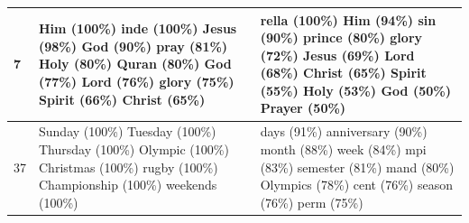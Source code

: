 \documentclass{article}
\begin{document}
\begin{table}[htbp]
\begin{tabular}{p{1.4cm} p{6cm} p{6cm}}
\midrule
7 & \colorbox{lightOlmoeLightBlue}{ Him} (100\%) \colorbox{lightOlmoeLightBlue}{inde} (100\%) \colorbox{lightOlmoeLightBlue}{ Jesus} (98\%) \colorbox{lightOlmoeLightBlue}{God} (90\%) \colorbox{lightOlmoeLightBlue}{ pray} (81\%) \colorbox{lightOlmoeLightBlue}{ Holy} (80\%) \colorbox{lightOlmoeLightBlue}{ Quran} (80\%) \colorbox{lightOlmoeLightBlue}{ God} (77\%) \colorbox{lightOlmoeLightBlue}{ Lord} (76\%) \colorbox{lightOlmoeLightBlue}{ glory} (75\%) \colorbox{lightOlmoeLightBlue}{ Spirit} (66\%) \colorbox{lightOlmoeLightBlue}{ Christ} (65\%) & \colorbox{lightOlmoeLightBlue}{rella} (100\%) \colorbox{lightOlmoeLightBlue}{ Him} (94\%) \colorbox{lightOlmoeLightBlue}{ sin} (90\%) \colorbox{lightOlmoeLightBlue}{ prince} (80\%) \colorbox{lightOlmoeLightBlue}{ glory} (72\%) \colorbox{lightOlmoeLightBlue}{ Jesus} (69\%) \colorbox{lightOlmoeLightBlue}{ Lord} (68\%) \colorbox{lightOlmoeLightBlue}{ Christ} (65\%) \colorbox{lightOlmoeLightBlue}{ Spirit} (55\%) \colorbox{lightOlmoeLightBlue}{ Holy} (53\%) \colorbox{lightOlmoeLightBlue}{ God} (50\%) \colorbox{lightOlmoeLightBlue}{ Prayer} (50\%) \\
\midrule
37 & \colorbox{lightOlmoeLightBlue}{ Sunday} (100\%) \colorbox{lightOlmoeLightBlue}{ Tuesday} (100\%) \colorbox{lightOlmoeLightBlue}{ Thursday} (100\%) \colorbox{lightOlmoeLightBlue}{ Olympic} (100\%) \colorbox{lightOlmoeLightBlue}{ Christmas} (100\%) \colorbox{lightOlmoeLightBlue}{ rugby} (100\%) \colorbox{lightOlmoeLightBlue}{ Championship} (100\%) \colorbox{lightOlmoeLightBlue}{ weekends} (100\%) & \colorbox{lightOlmoeLightBlue}{days} (91\%) \colorbox{lightOlmoeLightBlue}{ anniversary} (90\%) \colorbox{lightOlmoeLightBlue}{ month} (88\%) \colorbox{lightOlmoeLightBlue}{ week} (84\%) \colorbox{lightOlmoeLightBlue}{mpi} (83\%) \colorbox{lightOlmoeLightBlue}{ semester} (81\%) \colorbox{lightOlmoeLightBlue}{mand} (80\%) \colorbox{lightOlmoeLightBlue}{ Olympics} (78\%) \colorbox{lightOlmoeLightBlue}{ cent} (76\%) \colorbox{lightOlmoeLightBlue}{ season} (76\%) \colorbox{lightOlmoeLightBlue}{ perm} (75\%) \\

\end{tabular}
\end{table}
\end{document}
